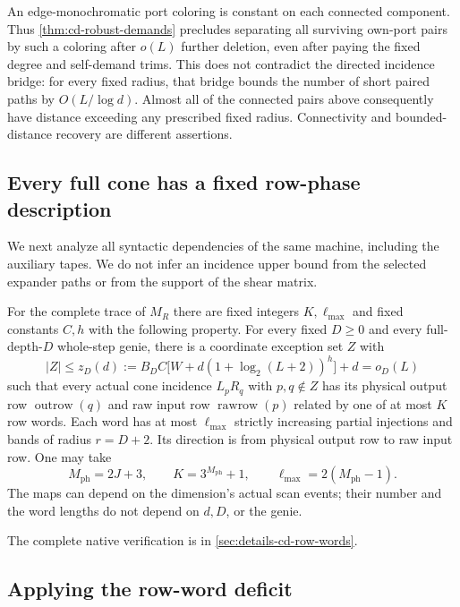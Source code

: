 An edge-monochromatic port coloring is constant on each connected
component.  Thus \cref{thm:cd-robust-demands} precludes separating
all surviving own-port pairs by such a coloring after $o(L)$ further
deletion, even after paying the fixed degree and self-demand trims.
This does not contradict the directed incidence bridge: for every fixed
radius, that bridge bounds the number of short paired paths by
$O(L/\log d)$.  Almost all of the connected pairs above consequently
have distance exceeding any prescribed fixed radius.  Connectivity and
bounded-distance recovery are different assertions.

\subsection{Every full cone has a fixed row-phase description}

We next analyze all syntactic dependencies of the same machine, including
the auxiliary tapes.  We do not infer an incidence upper bound from the
selected expander paths or from the support of the shear matrix.

\begin{lemma}\label{lem:cd-row-words}
\notformalized
For the complete trace of $M_R$ there are fixed integers $K,\ell_{\max}$ and fixed
constants $C,h$ with the following property.  For every fixed $D\ge0$
and every full-depth-$D$ whole-step genie, there is a coordinate exception
set $Z$ with
\[
 |Z|\le z_D(d):=B_D C\bigl[W+d(1+\log_2(L+2))^h\bigr]+d=o_D(L)
\]
such that every actual cone incidence $L_pR_q$ with $p,q\notin Z$ has
its physical output row $\operatorname{outrow}(q)$ and raw input row
$\operatorname{rawrow}(p)$ related by one of at most $K$ row words.
Each word has at most $\ell_{\max}$ strictly increasing partial injections and
bands of radius $r=D+2$.  Its direction is from physical output row to
raw input row.  One may take
\[
 M_{\mathrm{ph}}=2J+3,\qquad K=3^{M_{\mathrm{ph}}}+1,
 \qquad \ell_{\max}=2(M_{\mathrm{ph}}-1).
\]
The maps can depend on the dimension's actual scan events; their number
and the word lengths do not depend on $d,D$, or the genie.
\end{lemma}

The complete native verification is in \cref{sec:details-cd-row-words}.


\subsection{Applying the row-word deficit}

